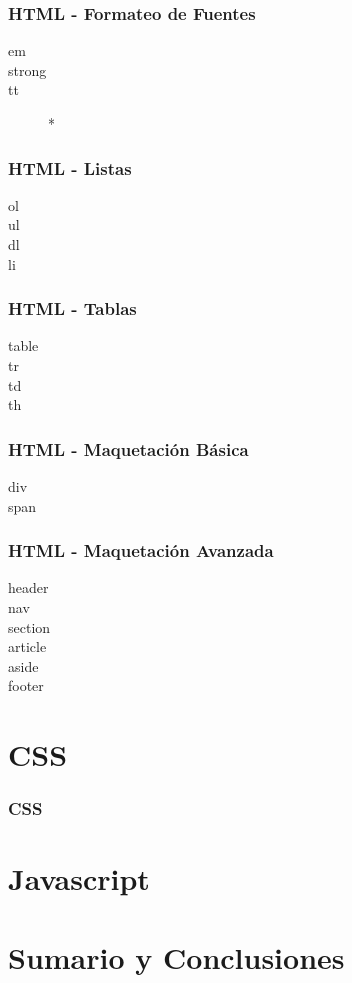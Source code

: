 \documentclass[a4paper,slidestop,xcolor=pst,blue]{beamer}
\begin{document}
\begin{frame}[c]
    \frametitle{HTML - Formateo de Fuentes}
    \begin{description}
        \item[em]
        \item[strong]
        \item[tt] *
    \end{description}
\end{frame}

\begin{frame}[c]
    \frametitle{HTML - Listas}
    \begin{description}
        \item[ol]
        \item[ul]
        \item[dl]
        \item[li]
    \end{description}
\end{frame}

\begin{frame}[c]
    \frametitle{HTML - Tablas}
    \begin{description}
        \item[table]
        \item[tr]
        \item[td]
        \item[th]
    \end{description}
\end{frame}

\begin{frame}[c]
    \frametitle{HTML - Maquetación Básica}
    \begin{description}
        \item[div]
        \item[span]
    \end{description}
\end{frame}

\begin{frame}[c]
    \frametitle{HTML - Maquetación Avanzada}
    \begin{description}
        \item[header]
        \item[nav]
        \item[section]
        \item[article]
        \item[aside]
        \item[footer]
    \end{description}
\end{frame}

\section{CSS}

\begin{frame}[c]
    \frametitle{CSS}
\end{frame}


\section{Javascript}


\section{Sumario y Conclusiones}
\end{document}
